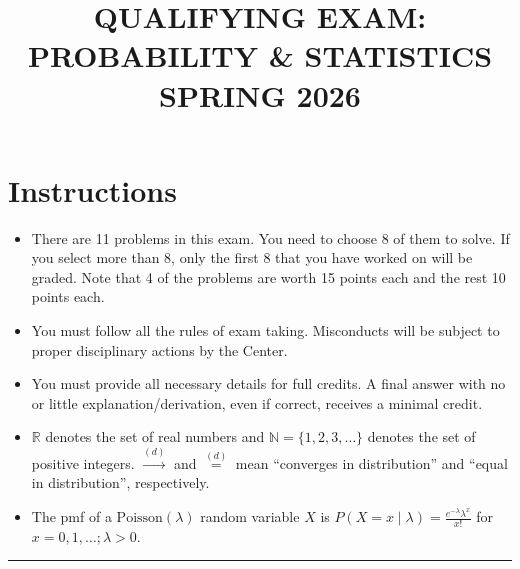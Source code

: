\documentclass[11pt,a4paper]{article}
\title{\textbf{QUALIFYING EXAM: PROBABILITY \& STATISTICS}\\[0.5em]\Large SPRING 2026}
\date{}
\author{}
\begin{document}
\maketitle
\vspace{-3em}

\section*{Instructions}
\begin{itemize}
    \item There are 11 problems in this exam. You need to choose 8 of them to solve. If you select more than 8, only the first 8 that you have worked on will be graded. Note that 4 of the problems are worth 15 points each and the rest 10 points each.
    \item You must follow all the rules of exam taking. Misconducts will be subject to proper disciplinary actions by the Center.
    \item You must provide all necessary details for full credits. A final answer with no or little explanation/derivation, even if correct, receives a minimal credit.
    \item $\mathbb{R}$ denotes the set of real numbers and $\mathbb{N} = \{1, 2, 3, \dots\}$ denotes the set of positive integers. $\xrightarrow{(d)}$ and $\stackrel{(d)}{=}$ mean ``converges in distribution'' and ``equal in distribution'', respectively.
    \item The pmf of a $\mathrm{Poisson}(\lambda)$ random variable $X$ is $P(X = x \mid \lambda) = \frac{e^{-\lambda} \lambda^x}{x!}$ for $x = 0, 1, \dots; \lambda > 0$.
\end{itemize}

\noindent\rule{\linewidth}{0.4pt}
\end{document}
